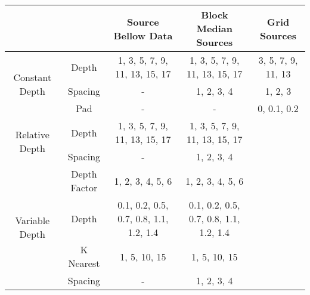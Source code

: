 \begin{tabular}{c c c c c}
& & Source Bellow Data & Block Median Sources & Grid Sources \\
\hline
\multirow{3}{*}{\parbox{0.05\linewidth}{\centering Constant Depth}}
    & Depth & 1, 3, 5, 7, 9, 11, 13, 15, 17 & 1, 3, 5, 7, 9, 11, 13, 15, 17 & 3, 5, 7, 9, 11, 13 \\
    & Spacing & - & 1, 2, 3, 4 & 1, 2, 3 \\
    & Pad & - & - & 0, 0.1, 0.2 \\
\hline
\multirow{2}{*}{\parbox{0.05\linewidth}{\centering Relative Depth}}
    & Depth & 1, 3, 5, 7, 9, 11, 13, 15, 17 & 1, 3, 5, 7, 9, 11, 13, 15, 17 \\
    & Spacing & - & 1, 2, 3, 4 \\
\hline
\multirow{4}{*}{\parbox{0.05\linewidth}{\centering Variable Depth}}
    & Depth Factor & 1, 2, 3, 4, 5, 6 & 1, 2, 3, 4, 5, 6 \\
    & Depth & 0.1, 0.2, 0.5, 0.7, 0.8, 1.1, 1.2, 1.4 & 0.1, 0.2, 0.5, 0.7, 0.8, 1.1, 1.2, 1.4 \\
    & K Nearest & 1, 5, 10, 15 & 1, 5, 10, 15 \\
    & Spacing & - & 1, 2, 3, 4 \\
\hline
\end{tabular}